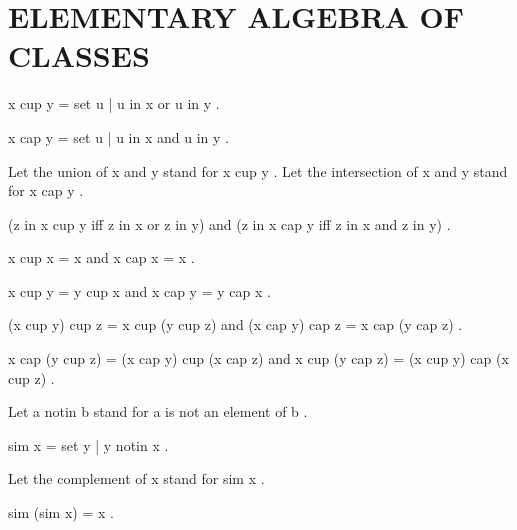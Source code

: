 \documentclass[a4paper,draft]{amsproc}
\begin{document}
\section{ELEMENTARY ALGEBRA OF CLASSES}
\begin{forthel}

\begin{definition} 
 x cup y = { set u | u in x  or  u in y } .
\end{definition}

\begin{definition} 
 x cap y = { set u | u in x  and  u in y } .
\end{definition}

Let the union of  x  and  y  stand for  x cup y .
Let the intersection of  x  and  y  stand for  x cap y .

\begin{theorem}
 (z in x cup y  iff  z in x  or  z in y) 
and  (z in x cap y  iff  z in x  and  z in y) .
\end{theorem}

\begin{theorem}
 x cup x = x  and  x cap x = x .
\end{theorem}

\begin{theorem}
 x cup y = y cup x  and  x cap y = y cap x .
\end{theorem}

\begin{theorem}
 (x cup y) cup z = x cup (y cup z)  
and  (x cap y) cap z = x cap (y cap z) .
\end{theorem}

\begin{theorem}
 x cap (y cup z) = (x cap y) cup (x cap z) 
and  x cup (y cap z) = (x cup y) cap (x cup z) .
\end{theorem}

Let  a notin b  stand for  a  is not an element of  b .

\begin{definition}
sim x = { set  y | y notin x} .
\end{definition}
Let the complement of  x  stand for  sim x .

\begin{theorem}
 sim (sim x) = x .
\end{theorem}


\end{forthel}
\end{document}
